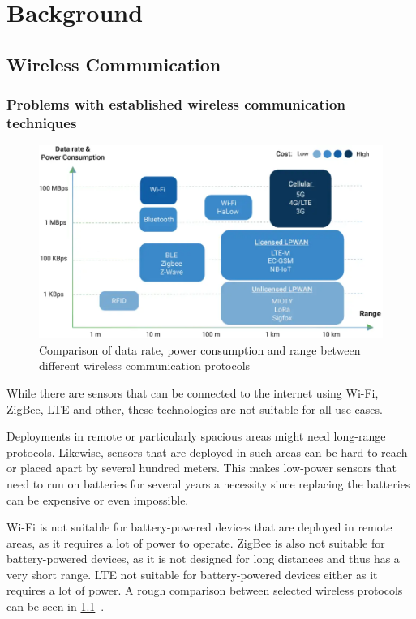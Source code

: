 \chapter{Background}

\section{Wireless Communication}


\subsection{Problems with established wireless communication techniques}

\begin{figure}[h]
    \centering
    \includegraphics[width=1\textwidth]{pictures/lora/comparison-wireless-protocols.png}
    \caption{Comparison of data rate, power consumption and range between different wireless communication protocols~\protect\cite{wang_comparison_2021}}\label{pic:wireless-protocols-comparison}
\end{figure}

While there are sensors that can be connected to the internet using Wi-Fi, ZigBee, \ac{LTE} and other, these technologies are not suitable for all use cases.

Deployments in remote or particularly spacious areas might need long-range protocols.
Likewise, sensors that are deployed in such areas can be hard to reach or placed apart by several hundred meters.
This makes low-power sensors that need to run on batteries for several years a necessity since replacing the batteries can be expensive or even impossible.

Wi-Fi is not suitable for battery-powered devices that are deployed in remote areas, as it requires a lot of power to operate.
ZigBee is also not suitable for battery-powered devices, as it is not designed for long distances and thus has a very short range.
\ac{LTE} not suitable for battery-powered devices either as it requires a lot of power.
A rough comparison between selected wireless protocols can be seen in \cref{pic:wireless-protocols-comparison}~\cite{wang_comparison_2021}.

